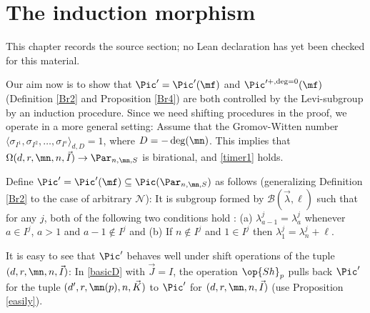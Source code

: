 \chapter{The induction morphism}
\label{rigid-local-systems-multiplicative-eigenvalue-problem-chapter-11}

\begin{remark}
\label{rigid-local-systems-multiplicative-eigenvalue-problem-chapter-11-source}
This chapter records the source section; no Lean declaration has yet been checked for this material.
\notready
\end{remark}

\label{noncan}
Our aim now is to show that  $\Pic'=\Pic'(\mf)$ and $\Pic'^{+,\deg=0}(\mf)$ (Definition  \ref{Br2} and Proposition \ref{Br4}) are both controlled by the Levi-subgroup by an induction procedure. Since we need shifting procedures in the proof, we operate in a more general setting:
Assume that the Gromov-Witten number $\langle\sigma_{I^1}, \sigma_{I^2},\dots,\sigma_{I^s}\rangle_{d,D}=1$, where $D=-\deg(\mn)$. This implies that $\Omega(d,r,\mn,n,\vec{I})\to \Par_{n,\mn,S}$ is birational, and \eqref{timer1} holds.

\begin{defi}
\notready
Define $\Pic'=\Pic'(\mf)\subseteq\Pic(\Par_{n,\mn,S})$ as follows (generalizing  Definition  \ref{Br2} to the case of arbitrary $\mathcal{N}$): It is subgroup formed by  $\mathcal{B}(\vec{\lambda},\ell)$ such that for any $j$, both of the following two conditions hold : (a) $\lambda^j_{a-1}=\lambda^{j}_{a}$ whenever $a\in I^j$, $a>1$ and $a-1\not \in I^j$ and (b) If $n\not\in I^j$ and $1\in I^j$ then $\lambda^j_1=\lambda^{j}_{n}+\ell$.
\end{defi}
It is easy to see that $\Pic'$ behaves well under shift operations of the tuple $(d,r,\mn,n,\vec{I})$: In \eqref{basicD} with $\vec{J}=I$, the operation $\op{Sh}_p$ pulls back $\Pic'$ for the tuple $(d',r,\mn(p),n,\vec{K})$ to $\Pic'$ for $(d,r,\mn,n,\vec{I})$ (use Proposition  \ref{easily}).


